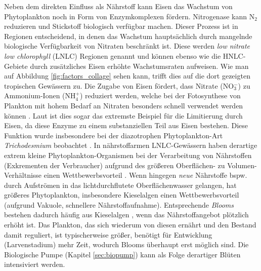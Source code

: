 \documentclass[12pt,a4paper,onecolumn,headheight=30pt]{scrartcl}
\begin{document}
Neben dem direkten Einfluss als Nährstoff kann Eisen das Wachstum von Phytoplankton noch in Form von Enzymkomplexen fördern. Nitrogenase kann N$_2$ reduzieren und Stickstoff biologisch verfügbar machen. Dieser Prozess ist in Regionen entscheidend, in denen das Wachstum hauptsächlich durch mangelnde biologische Verfügbarkeit von Nitraten beschränkt ist. Diese werden \textit{low nitrate low chlorophyll} (LNLC) Regionen genannt und können ebenso wie die HNLC-Gebiete durch zusätzliches Eisen erhöhte Wachstumsraten aufweisen. Wie man auf Abbildung \ref{fig:factors_collage} sehen kann, trifft dies auf die dort gezeigten tropischen Gewässern zu. Die Zugabe von Eisen fördert, dass Nitrate (NO$_3^-$) zu Ammonium-Ionen (NH$_4^+$) reduziert werden, welche bei der Fotosynthese von Plankton mit hohem Bedarf an Nitraten besonders schnell verwendet werden können \citep{Emerson.2009}. Laut \citet{Emerson.2009} ist dies sogar das extremste Beispiel für die Limitierung durch Eisen, da diese Enzyme zu einem substanziellen Teil aus Eisen bestehen. Diese Funktion wurde insbesondere bei der diazotrophen Phytoplankton-Art \textit{Trichodesmium} beobachtet \citep{Falkowski.1998}. In nährstoffarmen LNLC-Gewässern haben derartige extrem kleine Phytoplankton-Organismen bei der Verarbeitung von Nährstoffen (Exkrementen der Verbraucher) aufgrund des größeren Oberflächen- zu Volumen- Verhältnisse einen Wettbewerbsvorteil \citep{Falkowski.1998}. Wenn hingegen \textit{neue} Nährstoffe bspw. durch Aufströmen in das lichtdurchflutete Oberflächenwasser gelangen, hat größeres Phytoplankton, insbesondere Kieselalgen einen Wettbewerbsvorteil (aufgrund Vakuole, schnellere Nährstoffaufnahme). Entsprechende \textit{Blooms} bestehen dadurch häufig aus Kieselalgen \citep{Boyd.2007}, wenn das Nährstoffangebot plötzlich erhöht ist. Das Plankton, das sich wiederum von diesen ernährt und den Bestand damit reguliert, ist typischerweise größer, benötigt für Entwicklung (Larvenstadium) mehr Zeit, wodurch Blooms überhaupt erst möglich sind. Die Biologische Pumpe (Kapitel \ref{sec:biopump}) kann als Folge derartiger Blüten intensiviert werden. 
\end{document}
